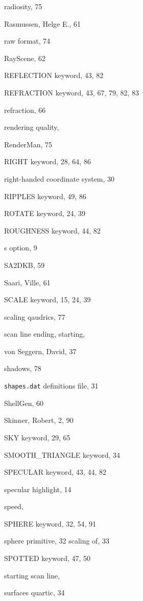 \begin{theindex}
  \item radiosity, 75
  \item Rasmussen, Helge E., 61
  \item raw format, 74
  \item RayScene, 62
  \item {\ptt REFLECTION} keyword, 43, 82
  \item {\ptt REFRACTION} keyword, 43, 67, 79, 82, 83
  \item refraction, 66
  \item rendering quality, 
  \item RenderMan, 75
  \item {\ptt RIGHT} keyword, 28, 64, 86
  \item right-handed coordinate system, 30
  \item {\ptt RIPPLES} keyword, 49, 86
  \item {\ptt ROTATE} keyword, 24, 39
  \item {\ptt ROUGHNESS} keyword, 44, 82

  \indexspace

  \item {\ptt s} option, 9
  \item {\ptt SA2DKB}, 59
  \item Saari, Ville, 61
  \item {\ptt SCALE} keyword, 15, 24, 39
  \item scaling qaudrics, 77
  \item scan line
    \subitem ending, 
    \subitem starting, 
  \item von Seggern, David, 37
  \item shadows, 78
  \item {\tt shapes.dat} definitions file, 31
  \item {\ptt ShellGen}, 60
  \item Skinner, Robert, 2, 90
  \item {\ptt SKY} keyword, 29, 65
  \item {\ptt SMOOTH\_TRIANGLE} keyword, 34
  \item {\ptt SPECULAR} keyword, 43, 44, 82
  \item specular highlight, 14
  \item speed, 
  \item {\ptt SPHERE} keyword, 32, 54, 91
  \item sphere
    \subitem primitive, 32
    \subitem scaling of, 33
  \item {\ptt SPOTTED} keyword, 47, 50
  \item starting scan line, 
  \item surfaces
    \subitem quartic, 34


\end{theindex}

